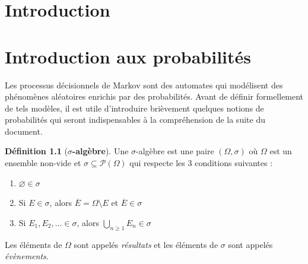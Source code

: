 \documentclass[12pt,a4paper]{report}
\theoremstyle{definition}%
\newtheorem{definition}{Définition}[chapter]
\theoremstyle{remark}
\begin{document}
\newpage
\tableofcontents
\listoftheorems[ignoreall,show={definition,theorem}]
\newpage

\chapter*{Introduction}

\chapter{Introduction aux probabilités}
Les processus décisionnels de Markov sont des automates qui modélisent des phénomènes aléatoires enrichis par des probabilités. Avant de définir formellement de tels modèles, il est utile d'introduire brièvement quelques notions de probabilités qui seront indispensables à la compréhension de la suite du document.

\begin{definition}[\textbf{$\sigma$-algèbre}]
	Une $\sigma$-algèbre est une paire $(\Omega, \sigma)$ où $\Omega$ est un ensemble non-vide et $\sigma \subseteq \mathcal{P}(\Omega)$ qui respecte les $3$ conditions suivantes :
	\begin{enumerate}
		\item $\varnothing \in \sigma$
		\item Si $E \in \sigma$, alors $\overline{E} = \Omega \setminus E$ et $\overline{E} \in \sigma$
		\item Si $E_1, E_2, \dots \in \sigma$, alors $\bigcup_{n \geq 1} E_n \in \sigma$
	\end{enumerate}
	Les éléments de $\Omega$ sont appelés \textit{résultats} et les éléments de $\sigma$ sont appelés \textit{évènements}.
\end{definition}
\end{document}
